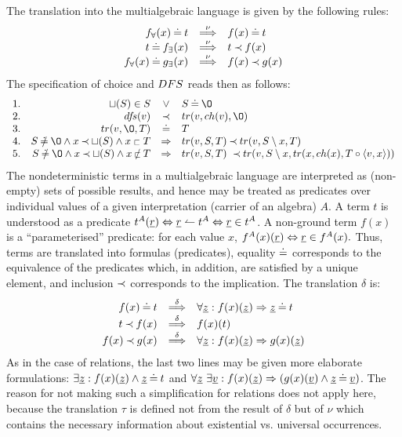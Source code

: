 The translation into the multialgebraic language is given by the following rules:
\begin{equation}\label{eq:multnu}
\begin{array}{rcl}
f_\forall(x) \mathbin{\doteq} t & \mathbin{\stackrel{\nu}{\Longrightarrow}} & f(x)\mathbin{\doteq} t\\ t \mathbin{\doteq} f_\exists(x) & \mathbin{\stackrel{\nu}{\Longrightarrow}} & t\mathbin{\prec} f(x) \\ f_\forall(x) \mathbin{\doteq} g_\exists(x) & \mathbin{\stackrel{\nu}{\Longrightarrow}} & f(x)\mathbin{\prec} g(x) \end{array}
\end{equation}
The specification of choice and $DFS$ reads then as follows: \[\begin{array}{rrcl}
1.& \ch(S) \in S & \lor & S\Eq\es \\
2.&\dfs(v) & \Incl & tr(v,ch(v),\es)\\
3. & tr(v,\es,T) & \Eq & T \\
4. & S\Not\Eq\es\land x\Incl\ch(S)\land x\lin T & \impl 
& tr(v,S,T) \Incl tr(v,S\setminus x,T) \\ 5. & S\Not\Eq\es\land x\Incl\ch(S)\land x\Not\lin T & \impl 
& tr(v,S,T)\ \Incl tr(v,S\setminus x,
tr(x,ch(x),T\ap\<v,x\> ))
\end{array} \]
The nondeterministic terms in a multialgebraic language are interpreted as (non-empty) sets
of possible results, and hence may be treated as predicates over individual values of a given interpretation (carrier of an algebra) $A$. A term $t$ is understood as a predicate $t^A(\underline{r})\mathrel{\Leftrightarrow} \underline{r}\leftharpoonup t^A\mathrel{\Leftrightarrow} \underline{r}\in t^A$.
A non-ground term $f(x)$ is a ``parameterised'' predicate: for each value $x$, $f^A(x)(\underline{r})\mathrel{\Leftrightarrow} \underline{r}\in f^A(x).$ Thus, terms are translated into formulas (predicates), equality $\mathbin{\doteq}$ corresponds to the equivalence of the predicates which, in addition, are satisfied by a unique element, and inclusion $\mathbin{\prec}$ corresponds to the implication. The translation $\delta$ is: \begin{equation}\label{eq:multdelta}
\begin{array}{rcl}
f(x)\mathbin{\doteq} t & \mathbin{\stackrel{\delta}{\Longrightarrow}} & \forall \underline{z}: f(x)(\underline{z})\mathrel\Rightarrow \underline{z}\mathbin{\doteq} t\\ t\mathbin{\prec} f(x) & \mathbin{\stackrel{\delta}{\Longrightarrow}} & f(x)(t) \\
f(x)\mathbin{\prec} g(x) & \mathbin{\stackrel{\delta}{\Longrightarrow}} & \forall \underline{z}:f(x)(\underline{z})\mathrel\Rightarrow g(x)(\underline{z})\\ \end{array}
\end{equation}
As in the case of relations, the last two lines may be given more elaborate formulations: $\exists \underline{z}:f(x)(\underline{z})\land \underline{z}\mathbin{\doteq} t$ and $\forall\underline{z}\ \exists\underline{v}:f(x)(\underline{z})\mathrel\Rightarrow (g(x)(\underline{v})\land\underline{z}\mathbin{\doteq}\underline{v})$.
The reason for not making such a simplification for relations does not apply here, because the translation $\tau$ is defined not from the result of $\delta$  but of $\nu$  which contains the necessary information about existential vs. universal occurrences. 

